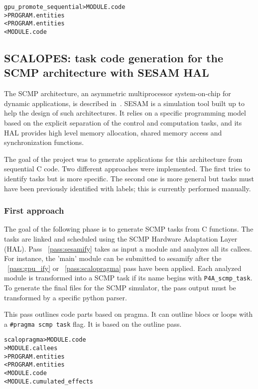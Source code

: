 \documentclass[a4paper]{report}
\newenvironment{PipsMake}{\begin{alltt}}{\end{alltt}}
\newcommand{\PipsPassRef}[1]{\texttt{\detokenize{#1}}~\ref{pass:#1}}
\newenvironment{PipsPass}[1]{\label{pass:#1}}{}
\begin{document}
\begin{PipsMake}
gpu_promote_sequential	> MODULE.code
		> PROGRAM.entities
		< PROGRAM.entities
		< MODULE.code
\end{PipsMake}

\subsection{SCALOPES: task code generation for the SCMP architecture with SESAM HAL}
\label{subsection-scalopes-project}

The SCMP architecture, an asymmetric multiprocessor system-on-chip for
dynamic applications, is described in~\cite{Ventroux2010}. SESAM is a
simulation tool built up to help the design of such architectures. It
relies on a specific programming model based on the explicit
separation of the control and computation tasks, and its HAL provides
high level memory allocation, shared memory access and synchronization
functions.

The goal of the project was to generate applications for this
architecture from sequential C code. Two different approaches were
implemented. The first tries to identify tasks but is more
specific. The second one is more general but tasks must have been
previously identified with labels; this is currently performed
manually.

\subsubsection{First approach}

The goal of the following phase is to generate SCMP tasks from C
functions. The tasks are linked and scheduled using the SCMP Hardware
Adaptation Layer (HAL). Pass \PipsPassRef{sesamify} takes as input a
module and analyzes all its callees. For instance, the 'main' module
can be submitted to sesamify after the \PipsPassRef{gpu_ify} or
\PipsPassRef{scalopragma} pass have been applied. Each analyzed module
is transformed into a SCMP task if its name begins with
\texttt{P4A\_scmp\_task}. To generate the final files for the SCMP
simulator, the pass output must be transformed by a specific python
parser.

\begin{PipsPass}{scalopragma}
This pass outlines code parts based on pragma.
It can outline blocs or loops with a \verb=#pragma scmp task= flag.
It is based on the outline pass.
\end{PipsPass}
\begin{PipsMake}
scalopragma                    > MODULE.code
                               > MODULE.callees
                               > PROGRAM.entities
               < PROGRAM.entities
               < MODULE.code
               < MODULE.cumulated_effects
\end{PipsMake}
\end{document}
